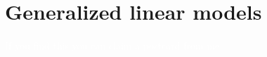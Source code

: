 \documentclass[\ifafour a4paper,12pt,\else a5paper,10pt,\fi%
onecolumn,oneside,article,%
british%
]{memoir}
\makeatletter
\theoremstyle{remark}
\theoremstyle{innote}
\def\sum{\DOTSI\sumop\slimits@}
\newcommand*{\de}{\partialup}%
\newcommand*{\p}{\mathrm{P}}%
\renewcommand*{\|}[1][]{\nonscript\,#1\vert\nonscript\;\mathopen{}}
\newcommand*{\tsum}{\mathop{\textstyle\sum}\nolimits}
\makeatother
\begin{document}
\section{Generalized linear models}
\label{sec:intro}

\textcolor{white}{If you find this you can claim a postcard from me.}









\end{document}
